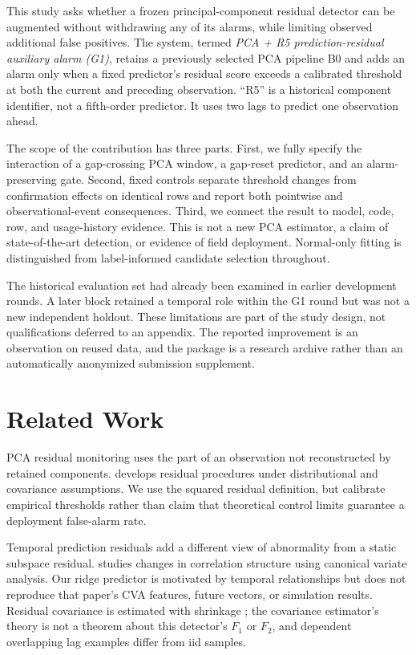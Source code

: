 \documentclass{article}
\begin{document}
This study asks whether a frozen principal-component residual detector can be augmented without withdrawing any of its alarms, while limiting observed additional false positives. The system, termed \emph{PCA + R5 prediction-residual auxiliary alarm (G1)}, retains a previously selected PCA pipeline B0 and adds an alarm only when a fixed predictor's residual score exceeds a calibrated threshold at both the current and preceding observation. ``R5'' is a historical component identifier, not a fifth-order predictor. It uses two lags to predict one observation ahead.

The scope of the contribution has three parts. First, we fully specify the interaction of a gap-crossing PCA window, a gap-reset predictor, and an alarm-preserving gate. Second, fixed controls separate threshold changes from confirmation effects on identical rows and report both pointwise and observational-event consequences. Third, we connect the result to model, code, row, and usage-history evidence. This is not a new PCA estimator, a claim of state-of-the-art detection, or evidence of field deployment. Normal-only fitting is distinguished from label-informed candidate selection throughout.

The historical evaluation set had already been examined in earlier development rounds. A later block retained a temporal role within the G1 round but was not a new independent holdout. These limitations are part of the study design, not qualifications deferred to an appendix. The reported improvement is an observation on reused data, and the package is a research archive rather than an automatically anonymized submission supplement.

\section{Related Work}
PCA residual monitoring uses the part of an observation not reconstructed by retained components. \citet{jackson1979} develops residual procedures under distributional and covariance assumptions. We use the squared residual definition, but calibrate empirical thresholds rather than claim that theoretical control limits guarantee a deployment false-alarm rate.

Temporal prediction residuals add a different view of abnormality from a static subspace residual. \citet{jiang2017} studies changes in correlation structure using canonical variate analysis. Our ridge predictor is motivated by temporal relationships but does not reproduce that paper's CVA features, future vectors, or simulation results. Residual covariance is estimated with shrinkage \citep{ledoit2004}; the covariance estimator's theory is not a theorem about this detector's $F_1$ or $F_2$, and dependent overlapping lag examples differ from iid samples.
\end{document}
